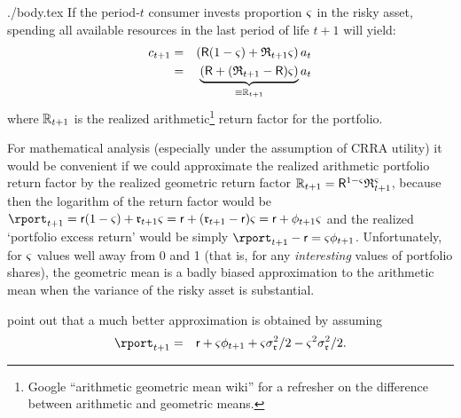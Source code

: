 \documentclass{bejournal}
\begin{document}
\begin{verbatimwrite}{./body.tex}
If the period-$t$ consumer invests proportion ${\varsigma}$ in the risky asset, 
spending all available resources in the last period of life $t+1$ will yield:
\begin{eqnarray}
        c_{t+1} & = & \left(\mathsf{R}(1-{\varsigma})+\mathfrak{R}_{t+1}{\varsigma}\right)a_{t} \notag
\\ & = & \underbrace{\left(\mathsf{R}+(\mathfrak{R}_{t+1}-\mathsf{R}){\varsigma}\right)}_{\equiv \mathbb{R}_{t+1}}a_{t} \label{eq:RportDef}
\end{eqnarray}
where $\mathbb{R}_{t+1}$ is the realized arithmetic\footnote{Google ``arithmetic geometric mean wiki'' for a refresher on the difference between arithmetic and geometric means.} return factor for the portfolio.

For mathematical analysis (especially under the assumption of CRRA
utility) it would be convenient if we could approximate the realized
arithmetic portfolio return factor by the realized geometric return
factor
$\mathbb{R}_{t+1}=\mathsf{R}^{1-{\varsigma}}\mathfrak{R}_{t+1}^{{\varsigma}}$,
because then the logarithm of the return factor would be $\rport_{t+1}
= \rfree (1-\riskyshare)+\risky_{t+1}\riskyshare = \rfree +
(\risky_{t+1}-\rfree)\riskyshare = \rfree + \eprem_{t+1} \riskyshare$
and the realized `portfolio excess return' would be simply
$\rport_{t+1}-\rfree = \riskyshare\eprem_{t+1}$.  Unfortunately, for
${\varsigma}$ values well away from 0 and 1 (that is, for any {\it
  interesting} values of portfolio shares), the geometric mean is a
badly biased approximation to the arithmetic mean when the variance of
the risky asset is substantial.

\cite{cvAppendix} point out that a much better approximation is obtained by assuming
\begin{eqnarray}
  \rport_{t+1} & = & \rfree+ \riskyshare \eprem_{t+1}+\riskyshare \sigma^{2}_{\risky}/2 - \riskyshare^{2}\sigma^{2}_{\risky}/2 \label{eq:rportCV}.
\end{eqnarray}


\end{verbatimwrite}
\end{document}
